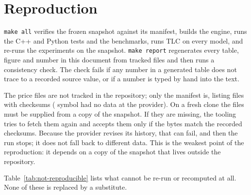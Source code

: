 \section{Reproduction}\label{sec:reproduction}
\texttt{make all} verifies the frozen snapshot against its manifest, builds the engine, runs the C++ and Python tests and the benchmarks, runs TLC on every model, and re-runs the experiments on the snapshot. \texttt{make report} regenerates every table, figure and number in this document from tracked files and then runs a consistency check. The check fails if any number in a generated table does not trace to a recorded source value, or if a number is typed by hand into the text.

The price files are not tracked in the repository; only the manifest is, listing \SnapshotFiles{} files with checksums (\SnapshotUnavailable{} symbol had no data at the provider). On a fresh clone the files must be supplied from a copy of the snapshot. If they are missing, the tooling tries to fetch them again and accepts them only if the bytes match the recorded checksums. Because the provider revises its history, that can fail, and then the run stops; it does not fall back to different data. This is the weakest point of the reproduction: it depends on a copy of the snapshot that lives outside the repository.

Table~\ref{tab:not-reproducible} lists what cannot be re-run or recomputed at all. None of these is replaced by a substitute.


